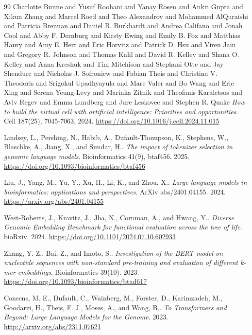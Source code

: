 \documentclass{ifacconf}
\begin{document}
\begin{thebibliography}{99}
Charlotte Bunne and Yusuf Roohani and Yanay Rosen and Ankit Gupta and Xikun Zhang and Marcel Roed and Theo Alexandrov and Mohammed AlQuraishi and Patricia Brennan and Daniel B. Burkhardt and Andrea Califano and Jonah Cool and Abby F. Dernburg and Kirsty Ewing and Emily B. Fox and Matthias Haury and Amy E. Herr and Eric Horvitz and Patrick D. Hsu and Viren Jain and Gregory R. Johnson and Thomas Kalil and David R. Kelley and Shana O. Kelley and Anna Kreshuk and Tim Mitchison and Stephani Otte and Jay Shendure and Nicholas J. Sofroniew and Fabian Theis and Christina V. Theodoris and Srigokul Upadhyayula and Marc Valer and Bo Wang and Eric Xing and Serena Yeung-Levy and Marinka Zitnik and Theofanis Karaletsos and Aviv Regev and Emma Lundberg and Jure Leskovec and Stephen R. Quake
\textit{How to build the virtual cell with artificial intelligence: Priorities and opportunities}.
Cell 187(25), 7045-7063. 2024.
\url{https://doi.org/10.1016/j.cell.2024.11.015}

Lindsey, L., Pershing, N., Habib, A., Dufault-Thompson, K., Stephens, W., Blaschke, A., Jiang, X., and Sundar, H..
\textit{The impact of tokenizer selection in genomic language models}.
Bioinformatics 41(9), btaf456. 2025.
\url{https://doi.org/10.1093/bioinformatics/btaf456}

Liu, J., Yang, M., Yu, Y., Xu, H., Li, K., and Zhou, X..
\textit{Large language models in bioinformatics: applications and perspectives}.
ArXiv abs/2401.04155. 2024.
\url{https://arxiv.org/abs/2401.04155}

West-Roberts, J., Kravitz, J., Jha, N., Cornman, A., and Hwang, Y..
\textit{Diverse Genomic Embedding Benchmark for functional evaluation across the tree of life}.
bioRxiv. 2024.
\url{https://doi.org/10.1101/2024.07.10.602933}

Zhang, Y. Z., Bai, Z., and Imoto, S..
\textit{Investigation of the BERT model on nucleotide sequences with non-standard pre-training and evaluation of different k-mer embeddings}.
Bioinformatics 39(10). 2023.
\url{https://doi.org/10.1093/bioinformatics/btad617}

Consens, M. E., Dufault, C., Wainberg, M., Forster, D., Karimzadeh, M., Goodarzi, H., Theis, F. J., Moses, A., and Wang, B..
\textit{To Transformers and Beyond: Large Language Models for the Genome}.
2023.
\url{http://arxiv.org/abs/2311.07621}


\end{thebibliography}
\end{document}
